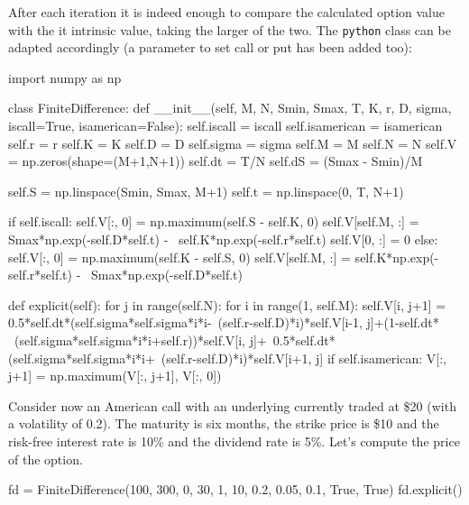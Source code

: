 After each iteration it is indeed enough to compare the calculated option value with the it intrinsic value, taking the larger of the two. The \texttt{python} class can be adapted accordingly (a parameter to set call or put has been added too):
\begin{ipython}
import numpy as np

class FiniteDifference:
    def __init__(self, M, N, Smin, Smax, T, K, r, D, sigma, 
                 iscall=True, isamerican=False):
        self.iscall = iscall
        self.isamerican = isamerican
        self.r = r
        self.K = K
        self.D = D
        self.sigma = sigma
        self.M = M
        self.N = N
        self.V = np.zeros(shape=(M+1,N+1))   
        self.dt = T/N
        self.dS = (Smax - Smin)/M

        self.S = np.linspace(Smin, Smax, M+1)
        self.t = np.linspace(0, T, N+1)

        if self.iscall:
            self.V[:, 0] = np.maximum(self.S - self.K, 0)
            self.V[self.M, :] = Smax*np.exp(-self.D*self.t) - \
                                self.K*np.exp(-self.r*self.t)
            self.V[0, :] = 0
        else:
            self.V[:, 0] = np.maximum(self.K - self.S, 0)
            self.V[self.M, :] = self.K*np.exp(-self.r*self.t) - \
                                Smax*np.exp(-self.D*self.t)

    def explicit(self):
        for j in range(self.N):
            for i in range(1, self.M):
                self.V[i, j+1] = 0.5*self.dt*(self.sigma*self.sigma*i*i-\
                                 (self.r-self.D)*i)*self.V[i-1, j]+(1-self.dt* \
                                 (self.sigma*self.sigma*i*i+self.r))*self.V[i, j]+\
                                 0.5*self.dt*(self.sigma*self.sigma*i*i+\
                                 (self.r-self.D)*i)*self.V[i+1, j]
            if self.isamerican:
                V[:, j+1] = np.maximum(V[:, j+1], V[:, 0])
\end{ipython}             

Consider now an American call with an underlying currently traded at \$20 (with a volatility of 0.2). The maturity is six months, the strike price is \$10 and the risk-free interest rate is 10\% and the dividend rate is 5\%. Let's compute the price of the option.
\begin{ipython}
fd = FiniteDifference(100, 300, 0, 30, 1, 10, 0.2, 0.05, 0.1, True, True)
fd.explicit()
\end{ipython}

